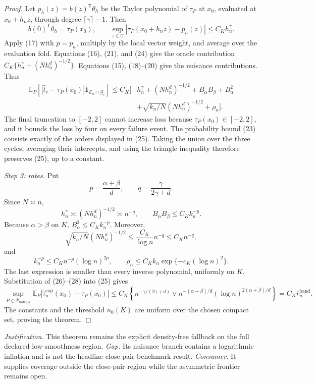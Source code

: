 \documentclass{article}
\begin{document}
\begin{proof}
Let \(p_h(z)=b(z)^{\mathsf T}\theta_h\) be the Taylor polynomial of \(\tau_P\) at \(x_0\), evaluated at \(x_0+h_nz\), through degree \(\lceil\gamma\rceil-1\).  Then
\[
b(0)^{\mathsf T}\theta_h=\tau_P(x_0),
\qquad
\sup_{z\in\mathcal C}|\tau_P(x_0+h_nz)-p_h(z)|
\le C_Kh_n^\gamma.
\tag{24}
\]
Apply (17) with \(p=p_h\), multiply by the local vector weight, and average over the evaluation fold.  Equations (16), (21), and (24) give the oracle contribution \(C_K\{h_n^\gamma+(Nh_n^d)^{-1/2}\}\).  Equations (15), (18)--(20) give the nuisance contributions.  Thus
\[
\begin{aligned}
\mathbb E_P\!\left[
|\widehat t_r-\tau_P(x_0)|
\mathbf 1_{\mathcal E_n\cap\mathcal G_r}\right]
\le C_K\big[&h_n^\gamma+(Nh_n^d)^{-1/2}
+B_\alpha B_\beta+B_\alpha^2\\
&+\sqrt{k_n/N}(Nh_n^d)^{-1/2}+\rho_n\big].
\end{aligned}
\tag{25}
\]
The final truncation to \([-2,2]\) cannot increase loss because \(\tau_P(x_0)\in[-2,2]\), and it bounds the loss by four on every failure event.  The probability bound (23) consists exactly of the orders displayed in (25).  Taking the union over the three cycles, averaging their intercepts, and using the triangle inequality therefore preserves (25), up to a constant.

\emph{Step 3: rates.}
Put
\[
p=\frac{\alpha+\beta}{d},
\qquad q=\frac{\gamma}{2\gamma+d}.
\]
Since \(N\asymp n\),
\[
h_n^\gamma\asymp(Nh_n^d)^{-1/2}\asymp n^{-q},
\qquad
B_\alpha B_\beta\le C_Kk_n^{-p}.
\tag{26}
\]
Because \(\alpha>\beta\) on \(K\), \(B_\alpha^2\le C_Kk_n^{-p}\).  Moreover,
\[
\sqrt{k_n/N}(Nh_n^d)^{-1/2}
\le \frac{C_K}{\log n}n^{-q}\le C_Kn^{-q},
\tag{27}
\]
and
\[
k_n^{-p}\le C_Kn^{-p}(\log n)^{2p},
\qquad
\rho_n\le C_Kk_n\exp\{-c_K(\log n)^2\}.
\tag{28}
\]
The last expression is smaller than every inverse polynomial, uniformly on \(K\).  Substitution of (26)--(28) into (25) gives
\[
\sup_{P\in\mathcal P_{\mathrm{band},n}}
\mathbb E_P\left|
\widehat\tau_n^{\mathrm{cap}}(x_0)-\tau_P(x_0)
\right|
\le C_K\left\{n^{-\gamma/(2\gamma+d)}
\vee n^{-(\alpha+\beta)/d}(\log n)^{2(\alpha+\beta)/d}\right\}
=C_K\overline r_n^{\mathrm{band}}.
\]
The constants and the threshold \(n_0(K)\) are uniform over the chosen compact set, proving the theorem.
\end{proof}
\par\smallskip\noindent \textit{Justification.} This theorem remains the explicit density-free fallback on the full declared low-smoothness region. \textit{Gap.} Its nuisance branch contains a logarithmic inflation and is not the headline close-pair benchmark result. \textit{Consumer.} It supplies coverage outside the close-pair region while the asymmetric frontier remains open.
\end{document}
